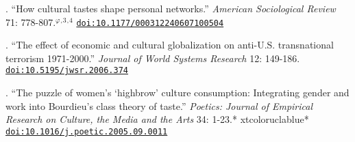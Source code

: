 
. ``How cultural tastes shape personal networks.'' {\em American Sociological Review} 71:  778-807.\textcolor{black}{$^{\varphi}$}$^{,}$\textcolor{uclablue}{$^{3}$}$^{,}$\textcolor{uclablue}{$^{4}$}
\newline\href{https://doi.org/10.1177/000312240607100504}{\nolinkurl{doi:10.1177/000312240607100504}}

. ``The effect of economic and cultural globalization on anti-U.S. transnational terrorism 1971-2000.'' {\em Journal of World Systems Research} 12:  149-186. \href{https://doi.org/10.5195/jwsr.2006.374}{\nolinkurl{doi:10.5195/jwsr.2006.374}}

. ``The puzzle of women's `highbrow' culture consumption: Integrating gender and work into Bourdieu's class theory of taste.'' {\em Poetics: Journal of Empirical Research on Culture, the Media and the Arts} 34: 1-23.\textcolor{uclablue}{*} xtcolor{uclablue}{*} \href{https://doi.org/10.1016/j.poetic.2005.09.001}{\nolinkurl{doi:10.1016/j.poetic.2005.09.0011}}
